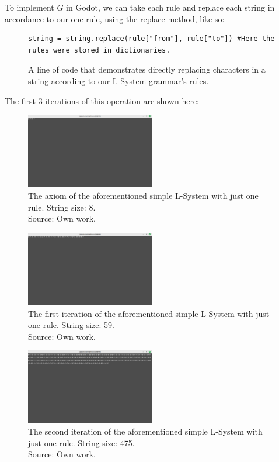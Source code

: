 To implement $G$ in Godot, we can take each rule and replace each string in accordance to our one rule, using the replace method, like so:

\begin{figure}[H]
    \centering
    \begin{lstlisting}
string = string.replace(rule["from"], rule["to"]) #Here the rules were stored in dictionaries.
    \end{lstlisting}
    \caption{A line of code that demonstrates directly replacing characters in a string according to our L-System grammar's rules.}
    \label{fig:lsys-snippet-1}
\end{figure}

The first 3 iterations of this operation are shown here:

\begin{figure}[H]
	\centering
	\includegraphics[width=0.5\textwidth]{Images/initial-l-system-iteration-0.png}
	\caption{The axiom of the aforementioned simple L-System with just one rule. String size: 8.\\Source: Own work.}
	\label{fig:lsysiter0}
\end{figure}

\begin{figure}[H]
	\centering
	\includegraphics[width=0.5\textwidth]{Images/initial-l-system-iteration-1.png}
	\caption{The first iteration of the aforementioned simple L-System with just one rule. String size: 59.\\Source: Own work.}
	\label{fig:lsysiter1}
\end{figure}

\begin{figure}[H]
	\centering
	\includegraphics[width=0.5\textwidth]{Images/initial-l-system-iteration-2.png}
	\caption{The second iteration of the aforementioned simple L-System with just one rule. String size: 475.\\Source: Own work.}
	\label{fig:lsysiter2}
\end{figure}

